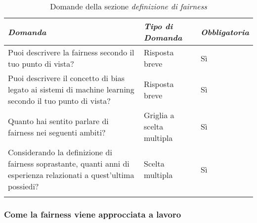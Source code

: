 \begin{longtable}{| p{} | p{} | p{} |} 
\hline\textbf{\textit{Domanda}} & \textbf{\textit{Tipo di Domanda}} & \textbf{\textit{Obbligatoria}}\\
\hline
\endhead 

\hline 
Puoi descrivere la fairness secondo il tuo punto di vista?

& Risposta breve

& Sì 

\\ \hline
\rowcolor{Gray!30}
Puoi descrivere il concetto di bias legato ai sistemi di machine learning secondo il tuo punto di vista?

& Risposta breve

& Sì 

\\ \hline

Quanto hai sentito parlare di fairness nei seguenti ambiti?    

&  Griglia a scelta multipla

& Sì

\\ \hline
\rowcolor{Gray!30}
Considerando la definizione di fairness soprastante, quanti anni di esperienza relazionati a quest'ultima possiedi?     

&  Scelta multipla

& Sì

\\ 
\hline 
\caption{Domande della sezione \emph{definizione di fairness}} %
\label{tab:myfirstlongtable}
\end{longtable}

\subsubsection{Come la fairness viene approcciata a lavoro}

